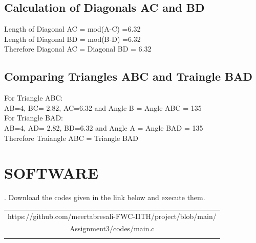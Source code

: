 \documentclass[conference]{IEEEtran}
\begin{document}
\subsection{Calculation of Diagonals AC and BD}
\begin{flushleft}
Length of Diagonal AC = mod(A-C) =6.32 \\
Length of Diagonal BD = mod(B-D) =6.32 \\
Therefore Diagonal AC = Diagonal BD = 6.32\\
\end{flushleft}
\vspace{0.25cm}
\subsection{Comparing Triangles ABC and Traingle BAD }
\begin{flushleft}
For Triangle ABC:\\
AB=4, BC= 2.82, AC=6.32 and Angle B = Angle ABC = 135 \\
For Triangle BAD:\\
AB=4, AD= 2.82, BD=6.32 and Angle A = Angle BAD = 135 \\
Therefore Traiangle ABC = Triangle BAD\\
\end{flushleft}
\vspace{0.25cm}
\section{SOFTWARE}
. Download the codes given in the link below and execute them.\\

\begin{table}[h]
\centering
\begin{tabular}{| c |} \hline
\rule{0pt}{20pt} 
https://github.com/meertabresali-FWC-IITH/project/blob/main/ \\
Assignment3/codes/main.c\\
\\\hline
 \end{tabular}
\end{table}
\end{document}
